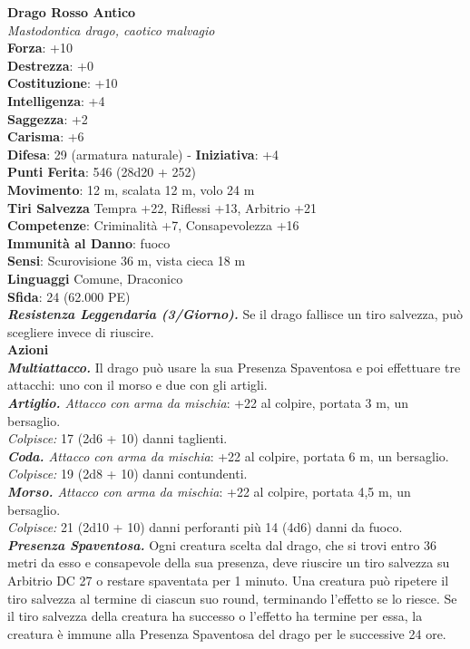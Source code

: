 \begin{multicols}{2}
\medskip\textbf{Drago Rosso Antico}\\
\emph{Mastodontica drago, caotico malvagio}\\
\textbf{Forza}: +10\\
\textbf{Destrezza}: +0\\
\textbf{Costituzione}: +10\\
\textbf{Intelligenza}: +4\\
\textbf{Saggezza}: +2\\
\textbf{Carisma}: +6\\
\textbf{Difesa}: 29 (armatura naturale) - \textbf{Iniziativa}: +4\\
\textbf{Punti Ferita}: 546 (28d20 + 252)\\
\textbf{Movimento}: 12 m, scalata 12 m, volo 24 m\\
\textbf{Tiri Salvezza} Tempra +22, Riflessi +13, Arbitrio +21\\
\textbf{Competenze}: Criminalità +7, Consapevolezza +16\\
\textbf{Immunità al Danno}: fuoco\\
\textbf{Sensi}: Scurovisione 36 m, vista cieca 18 m\\
\textbf{Linguaggi} Comune, Draconico\\
\textbf{Sfida}: 24 (62.000 PE)\smallskip\\
\emph{\textbf{Resistenza Leggendaria (3/Giorno).}} Se il drago fallisce un tiro salvezza, può scegliere invece di riuscire.\\
\smallskip\textbf{Azioni}\\
\emph{\textbf{Multiattacco.}} Il drago può usare la sua Presenza Spaventosa e poi effettuare tre attacchi: uno con il morso e due con gli artigli.\\
\emph{\textbf{Artiglio.} Attacco con arma da mischia}: +22 al colpire, portata 3 m, un bersaglio.\\
\emph{Colpisce:} 17 (2d6 + 10) danni taglienti.\\
\emph{\textbf{Coda.} Attacco con arma da mischia}: +22 al colpire, portata 6 m, un bersaglio.\\
\emph{Colpisce:} 19 (2d8 + 10) danni contundenti.\\
\emph{\textbf{Morso.} Attacco con arma da mischia}: +22 al colpire, portata 4,5 m, un bersaglio.\\
\emph{Colpisce:} 21 (2d10 + 10) danni perforanti più 14 (4d6) danni da fuoco.\\
\emph{\textbf{Presenza Spaventosa.}} Ogni creatura scelta dal drago, che si trovi entro 36 metri da esso e consapevole della sua presenza, deve riuscire un tiro salvezza su Arbitrio DC  27 o restare spaventata per 1 minuto. Una creatura può ripetere il tiro salvezza al termine di ciascun suo round, terminando l'effetto se lo riesce. Se il tiro salvezza della creatura ha successo o l'effetto ha termine per essa, la creatura è immune alla Presenza Spaventosa del drago per le successive 24 ore.\\

\end{multicols}
